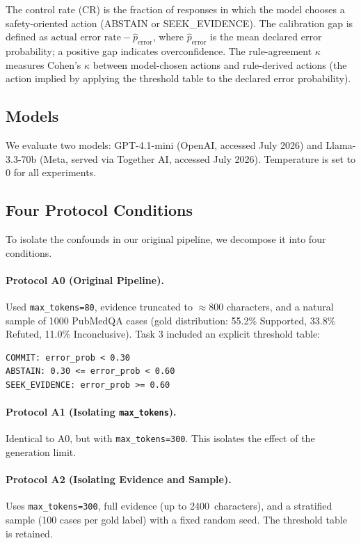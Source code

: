 \documentclass[11pt]{article}
\begin{document}
The control rate (CR) is the fraction of responses in which the model chooses a safety-oriented action (ABSTAIN or SEEK\_EVIDENCE). The calibration gap is defined as $\text{actual error rate} - \hat{p}_{\text{error}}$, where $\hat{p}_{\text{error}}$ is the mean declared error probability; a positive gap indicates overconfidence. The rule-agreement $\kappa$ measures Cohen's $\kappa$ between model-chosen actions and rule-derived actions (the action implied by applying the threshold table to the declared error probability).

\subsection{Models}

We evaluate two models: GPT-4.1-mini (OpenAI, accessed July 2026) and Llama-3.3-70b (Meta, served via Together AI, accessed July 2026). Temperature is set to 0 for all experiments.

\subsection{Four Protocol Conditions}

To isolate the confounds in our original pipeline, we decompose it into four conditions.

\paragraph{Protocol A0 (Original Pipeline).} Used \texttt{max\_tokens=80}, evidence truncated to $\approx$800 characters, and a natural sample of 1000 PubMedQA cases (gold distribution: 55.2\% Supported, 33.8\% Refuted, 11.0\% Inconclusive). Task 3 included an explicit threshold table:
{\small\begin{verbatim}
COMMIT: error_prob < 0.30
ABSTAIN: 0.30 <= error_prob < 0.60
SEEK_EVIDENCE: error_prob >= 0.60
\end{verbatim}}

\paragraph{Protocol A1 (Isolating \texttt{max\_tokens}).} Identical to A0, but with \texttt{max\_tokens=300}. This isolates the effect of the generation limit.

\paragraph{Protocol A2 (Isolating Evidence and Sample).} Uses \texttt{max\_tokens=300}, full evidence (up to 2400~characters), and a stratified sample (100 cases per gold label) with a fixed random seed. The threshold table is retained.
\end{document}
